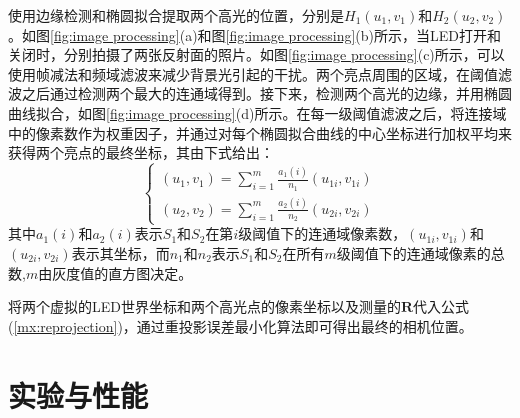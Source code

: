 使用边缘检测和椭圆拟合提取两个高光的位置，分别是$H_1(u_1,v_1)$和$H_2(u_2,v_2)$。如图\ref{fig:image processing}(a)和图\ref{fig:image processing}(b)所示，当LED打开和关闭时，分别拍摄了两张反射面的照片。如图\ref{fig:image processing}(c)所示，可以使用帧减法和频域滤波来减少背景光引起的干扰。两个亮点周围的区域，在阈值滤波之后通过检测两个最大的连通域得到。接下来，检测两个高光的边缘，并用椭圆曲线拟合，如图\ref{fig:image processing}(d)所示。在每一级阈值滤波之后，将连接域中的像素数作为权重因子，并通过对每个椭圆拟合曲线的中心坐标进行加权平均来获得两个亮点的最终坐标，其由下式给出：
 \begin{equation}\label{highlightspixel}
              \begin{cases} 
                (u_{1},v_{1})=\sum_{i=1}^{m}\frac{a_{1}(i)}{n_{1}}(u_{1i},v_{1i})   \\
                (u_{2},v_{2})=\sum_{i=1}^{m}\frac{a_{2}(i)}{n_{2}}(u_{2i},v_{2i})              
              \end{cases}
\end{equation}
其中$a_{1}(i)$和$a_{2}(i)$表示$S_1$和$S_2$在第$i$级阈值下的连通域像素数，$(u_{1i},v_{1i})$和$(u_{2i},v_{2i})$表示其坐标，而$n_{1}$和$n_{2}$表示$S_1$和$S_2$在所有$m$级阈值下的连通域像素的总数,$m$由灰度值的直方图决定。

将两个虚拟的LED世界坐标和两个高光点的像素坐标以及测量的$\mathbf{R}$代入公式(\ref{mx:reprojection})，通过重投影误差最小化算法即可得出最终的相机位置。

\section{实验与性能}
